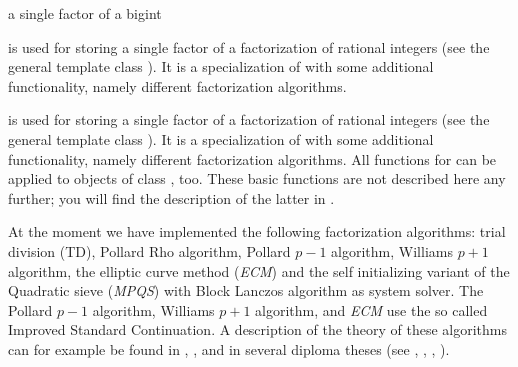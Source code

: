 
\newcommand{\upperbound}{\mathit{upper\uscore bound}}
\newcommand{\lowerbound}{\mathit{lower\uscore bound}}
\newcommand{\size}{\mathit{size}}
\newcommand{\step}{\mathit{step}}



\NAME
{} \dotfill a single factor of a bigint



\ABSTRACT

 is used for storing a single factor of a factorization of
rational integers (see the general template class ).  It is a
specialization of  with some additional functionality, namely different
factorization algorithms.



\DESCRIPTION

 is used for storing a single factor of a factorization of
rational integers (see the general template class ).  It is a
specialization of  with some additional functionality, namely different
factorization algorithms.  All functions for  can be applied to objects
of class , too.  These basic functions are not described here any
further; you will find the description of the latter in .

At the moment we have implemented the following factorization algorithms: trial division (TD),
Pollard Rho algorithm, Pollard $p-1$ algorithm, Williams $p+1$ algorithm, the elliptic curve
method (\emph{ECM}) and the self initializing variant of the Quadratic sieve (\emph{MPQS}) with
Block Lanczos algorithm as system solver.  The Pollard $p-1$ algorithm, Williams $p+1$
algorithm, and \emph{ECM} use the so called Improved Standard Continuation.  A description of
the theory of these algorithms can for example be found in \cite{Riesel:1994},
\cite{Alford/Pomerance:1993}, and in several diploma theses (see \cite{Denny_Thesis:1993},
\cite{Sosnowski_Thesis:1994}, \cite{Berger_Thesis:1993}, \cite{Mueller_Thesis:1995}).

